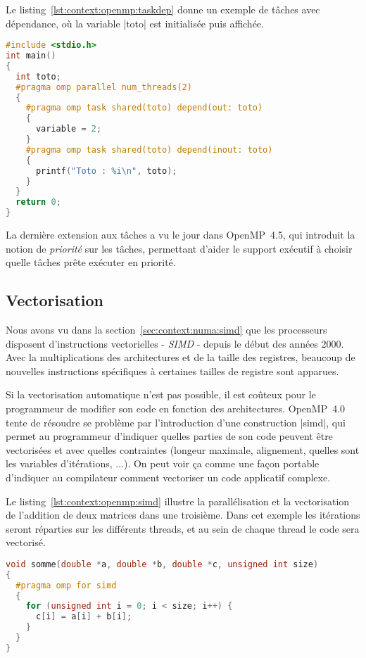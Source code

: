 Le listing~\ref{lst:context:openmp:taskdep} donne un exemple de tâches avec dépendance, où la variable |toto| est initialisée puis affichée.

\begin{lstlisting}[language=c++,caption=Exemple de tâches avec dépendances,label=lst:context:openmp:taskdep,basicstyle=\small]
#include <stdio.h>
int main()
{
  int toto;
  #pragma omp parallel num_threads(2)
  {
    #pragma omp task shared(toto) depend(out: toto)
    {
      variable = 2;
    }
    #pragma omp task shared(toto) depend(inout: toto)
    {
      printf("Toto : %i\n", toto);
    }
  }
  return 0;
}
\end{lstlisting}

La dernière extension aux tâches a vu le jour dans OpenMP~4.5, qui introduit la notion de \emph{priorité} sur les tâches, permettant d'aider le support exécutif à choisir quelle tâches prête exécuter en priorité.

\subsection{Vectorisation}

Nous avons vu dans la section~\ref{sec:context:numa:simd} que les processeurs disposent d'instructions vectorielles - \emph{SIMD} - depuis le début des années 2000.
Avec la multiplications des architectures et de la taille des registres, beaucoup de nouvelles instructions spécifiques à certaines tailles de registre sont apparues.

Si la vectorisation automatique n'est pas possible, il est coûteux pour le programmeur de modifier son code en fonction des architectures.
OpenMP~4.0 tente de résoudre se problème par l'introduction d'une construction |simd|, qui permet au programmeur d'indiquer quelles parties de son code peuvent être vectorisées et avec quelles contraintes (longeur maximale, alignement, quelles sont les variables d'itérations, ...).
On peut voir ça comme une façon portable d'indiquer au compilateur comment vectoriser un code applicatif complexe.

Le listing~\ref{lst:context:openmp:simd} illustre la parallélisation et la vectorisation de l'addition de deux matrices dans une troisième.
Dans cet exemple les itérations seront réparties sur les différents threads, et au sein de chaque thread le code sera vectorisé.

\begin{lstlisting}[language=c++,caption=Vectorisation d'une addition de deux tableaux,label=lst:context:openmp:simd,basicstyle=\small]
void somme(double *a, double *b, double *c, unsigned int size)
{
  #pragma omp for simd
  {
    for (unsigned int i = 0; i < size; i++) {
      c[i] = a[i] + b[i];
    }
  }
}
\end{lstlisting}



